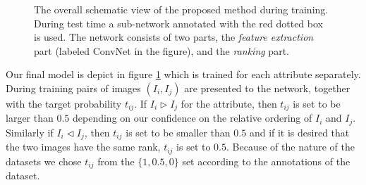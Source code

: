 \begin{figure}
{}
\caption{The overall schematic view of the proposed method during training. During test time a sub-network annotated with the red dotted box is used. The network consists of two parts, the \textit{feature extraction} part (labeled ConvNet in the figure), and the \textit{ranking} part.}
\label{fig.3}
\end{figure}

Our final model is depict in figure \ref{fig.3} which is trained for each attribute separately. During training pairs of images $(I_i, I_j)$ are presented to the network, together with the target probability $t_{ij}$. If $I_i \triangleright I_j$ for the attribute, then $t_{ij}$ is  set to be larger than $0.5$ depending on our confidence on the relative ordering of $I_i$ and $I_j$. Similarly if $I_i \triangleleft I_j$, then $t_{ij}$ is set to be smaller than $0.5$ and if it is desired that the two images have the same rank, $t_{ij}$ is set to $0.5$. Because of the nature of the datasets we chose $t_{ij}$ from the $\{1, 0.5, 0 \}$ set according to the annotations of the dataset.

